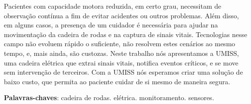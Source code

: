 \begin{resumo}

Pacientes com capacidade motora reduzida, em certo grau, necessitam de
observação contínua a fim de evitar acidentes ou outros problemas. Além
disso, em alguns casos, a presença de um cuidador é necessária para ajudar na
movimentação da cadeira de rodas e na captura de sinais vitais.
Tecnologias nesse campo não evoluem rápido o suficiente, não resolvem estes
cenários ao mesmo tempo, e, mais ainda, são custozas.
Neste trabalho nós apresentamos a UMISS, uma cadeira elétrica que extrai sinais
vitais, notifica eventos críticos, e se move sem intervenção de terceiros.
Com a UMISS nós esperamos criar uma solução de baixo custo, que permita ao
paciente cuidar de si mesmo de maneira segura.

 \vspace{\onelineskip}
    
 \noindent
 \textbf{Palavras-chaves}: cadeira de rodas. elétrica. monitoramento. sensores.
\end{resumo}
